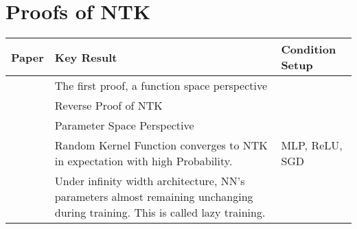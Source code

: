 \documentclass{article}
\begin{document}
\section{Proofs of NTK}

\begin{table}[H]
\centering
\begin{tabular}{|p{}|p{}|p{}|}
\hline
Paper & Key Result & Condition Setup \\
\hline
\cite{Jacot2020}        & The first proof, a function space perspective &  \\
\hline
\cite{Simon}            & Reverse Proof of NTK &\\
\hline
\cite{Lee2020}        & Parameter Space Perspective &  \\
\hline
\cite{Xu}        & Random Kernel Function converges to NTK in expectation with high Probability. & MLP, ReLU, SGD \\
\hline
\cite{Chizat2020,Geiger2020,Ghorbani}        & Under infinity width architecture, NN's parameters almost remaining unchanging during training. This is called lazy training. &  \\
\hline
\end{tabular}
\end{table}

\clearpage
\printbibliography
\end{document}
